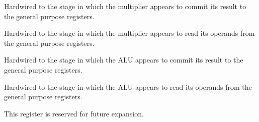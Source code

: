 \implementation{}

\reset{****}
Hardwired to the stage in which the multiplier appears to commit its result to
the general purpose registers.

\implementation{}

\reset{****}
Hardwired to the stage in which the multiplier appears to read its operands from
the general purpose registers.

\implementation{}

\reset{****}
Hardwired to the stage in which the ALU appears to commit its result to the
general purpose registers.

\implementation{}

\reset{****}
Hardwired to the stage in which the ALU appears to read its operands from the
general purpose registers.

\implementation{}


This register is reserved for future expansion.


